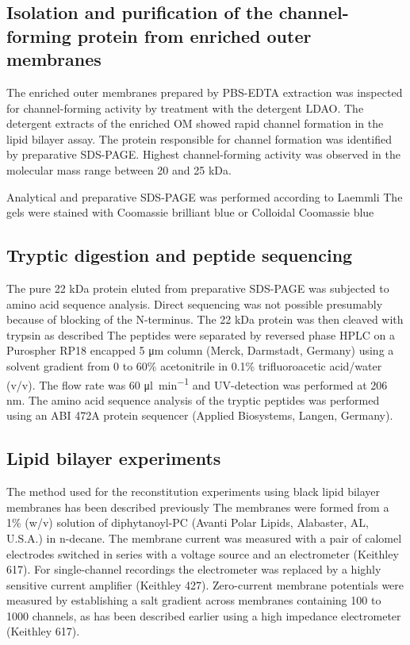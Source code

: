 \subsection{Isolation and purification of the channel-forming protein from enriched outer membranes}
\label{sub:porin_isolation}
The enriched outer membranes prepared by \ac{PBS}-\ac{EDTA} extraction was inspected for channel-forming activity by treatment with the detergent \ac{LDAO}. The detergent extracts of the enriched OM showed rapid channel formation in the lipid bilayer assay. The protein responsible for channel formation was identified by preparative \ac{SDS-PAGE}. Highest channel-forming activity was observed in the molecular mass range between 20 and 25 kDa.

Analytical and preparative \ac{SDS-PAGE} was performed according to Laemmli The gels were stained with Coomassie brilliant blue or Colloidal Coomassie blue 

\subsection{Tryptic digestion and peptide sequencing}
\label{sub:porin_tryptic}
The pure 22 kDa protein eluted from preparative \ac{SDS-PAGE} was subjected to amino acid sequence analysis. Direct sequencing was not possible presumably because of blocking of the N-terminus. The 22 kDa protein was then cleaved with trypsin as described The peptides were separated by reversed phase HPLC on a Purospher RP18 encapped 5 \si{\micro\metre} column (Merck, Darmstadt, Germany) using a solvent gradient from 0 to 60\% acetonitrile in 0.1\% trifluoroacetic acid/water (v/v). The flow rate was 60 \si{\micro\litre\per\minute} and UV-detection was performed at 206 \si{\nano\metre}. The amino acid sequence analysis of the tryptic peptides was performed using an ABI 472A protein sequencer (Applied Biosystems, Langen, Germany).

\subsection{Lipid bilayer experiments}
\label{sub:porin_bilayer}
The method used for the reconstitution experiments using black lipid bilayer membranes has been described previously The membranes were formed from a 1\% (w/v) solution of diphytanoyl-\ac{PC} (Avanti Polar Lipids, Alabaster, AL, U.S.A.) in n-decane. The membrane current was measured with a pair of calomel electrodes switched in series with a voltage source and an electrometer (Keithley 617). For single-channel recordings the electrometer was replaced by a highly sensitive current amplifier (Keithley 427). Zero-current membrane potentials were measured by establishing a salt gradient across membranes containing 100 to 1000 channels, as has been described earlier using a high impedance electrometer (Keithley 617).


